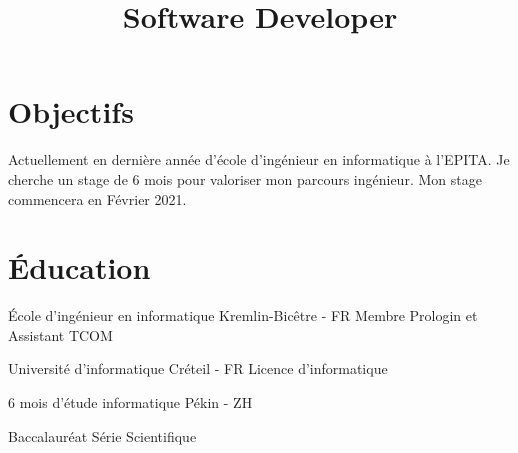 \documentclass[10pt,a4paper,sans]{moderncv}
\title{Software Developer}
\newcommand\en[1]{}
\newcommand\fr[1]{#1}
\newcommand\full[1]{}
\begin{document}
\makecvtitle
\vspace*{-10mm}

\section{\fr{Objectifs}\en{Objectives}}
\fr{
    Actuellement en dernière année d'école d'ingénieur en informatique à
    l'EPITA.
    Je cherche un stage de 6 mois pour valoriser mon parcours ingénieur. Mon
    stage commencera en Février 2021.
    \full{
        Je cherche à appliquer mes compétences analytiques aux défis proposés
        par un stage dans votre entreprise.
        Mes capacités en Algorithmique et en recherche permettront à votre
        organisation d'atteindre ses objectifs.
    }
}
\en{
    Seeking to apply my analytical skills to the challenges posed by an
    internship at your company. Poses proven algorithmic and research abilities
    that will aid your company in meeting its milestones.
}

\section{\fr{\'Education}\en{Education}}
{\fr{\'Ecole d'ingénieur en informatique}\en{Computer Engineering}}
{Kremlin-Bicêtre - FR}
{\fr{Membre Prologin et Assistant TCOM}\en{Member of the Prologin Association and TCOM assistant}}{}

\full{\cventry{2020}{Huawei}
{\fr{Formation des les équipements et sur eNSP}\en{Training about equipments and eNSP}}
{Visio conference}
{}{}}

{\fr{Université d'informatique}\en{Computer Engineering focused School}}
{Créteil - FR}
{\fr{Licence d'informatique}}{}

\full{\cventry{2018}{Google}{Q{\&}A Meeting with an Google Software Engineer.}
{FR}{}{}}

{\fr{6 mois d'étude informatique}\en{6 month studying IT engineering}}
{\fr{Pékin}\en{Beijing} - ZH}{}{}

\full{\cventry{2014}{BNSSA et PSE1}{\fr{Surveillant de baignade}\en{lifeguard}}{}{}{}}

{\fr{Baccalauréat}\en{High School diploma}}
{\fr{Série Scientifique}\en{Scientific section}}{}
{}{}
\end{document}

